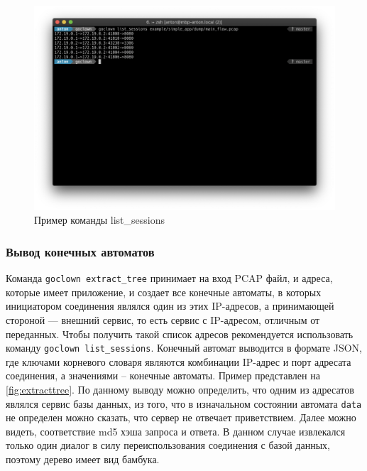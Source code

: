 \begin{figure}[H]
\includegraphics[width=\textwidth,height=\textheight,keepaspectratio]
    {img/list_sessions.png}
\caption{Пример команды list\_sessions}
\label{fig:listsessions}
\end{figure}

\subsubsection{Вывод конечных автоматов}
Команда \lstinline{goclown extract_tree} принимает на вход PCAP файл, и адреса,
которые имеет приложение, и создает все конечные автоматы, в которых инициатором
соединения являлся один из этих IP-адресов, а принимающей стороной --- внешний
сервис, то есть сервис с IP-адресом, отличным от переданных. Чтобы получить
такой список адресов рекомендуется использовать команду
\lstinline{goclown list_sessions}. Конечный автомат выводится в формате JSON,
где ключами корневого словаря являются комбинации IP-адрес и порт адресата
соединения, а значениями -- конечные автоматы. Пример представлен на
\autoref{fig:extracttree}. По данному выводу можно определить, что одним из
адресатов являлся сервис базы данных, из того, что в изначальном состоянии
автомата \lstinline{data} не определен можно сказать, что сервер не отвечает
приветствием. Далее можно видеть, соответствие md5 хэша запроса и ответа. В
данном случае извлекался только один диалог в силу переиспользования соединения
с базой данных, поэтому дерево имеет вид бамбука.

